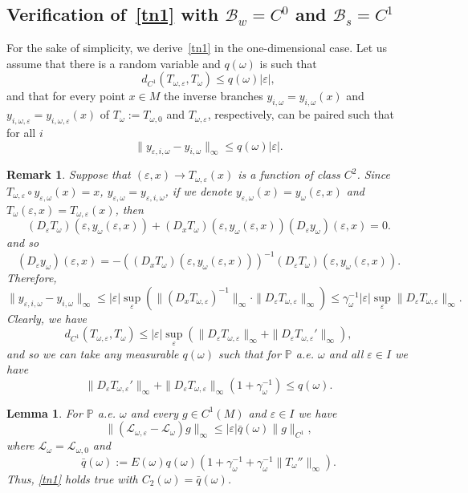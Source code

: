 \documentclass[11pt,reqno,a4paper]{article}
\newtheorem{lemma}[theorem]{Lemma}
\theoremstyle{special}
\newtheorem{remark}[theorem]{Remark}
\renewcommand{\epsilon}{\varepsilon}
\renewcommand{\L}{\mathcal{L}}
\def\B{\mathcal{B}}
\def\om{\omega}
\begin{document}
\subsection{Verification of~\eqref{tn1} with $\B_w=C^0$ and $\B_s=C^1$}
For the sake of simplicity, we derive~\eqref{tn1}  in the one-dimensional case. 
Let us assume that there is a random variable 
and $q(\omega)$ is such that 
\[
d_{C^1}(T_{\omega, \epsilon}, T_\omega) \le q(\omega)|\epsilon|,
\]
and that for every point $x\in M$ the inverse branches $y_{i,\om}=y_{i, \om}(x)$ and $y_{i,\om,\varepsilon}=y_{i,\om,\varepsilon}(x)$ of $T_\om:=T_{\om,0}$ and $T_{\om,\varepsilon}$, respectively, can be paired such that for all $i$
$$
\|y_{\epsilon, i, \omega}-y_{i, \omega}\|_\infty \le q(\omega)| \epsilon|.
$$
\begin{remark}\label{Rem 5.5}
Suppose that $(\varepsilon,x)\to T_{\om, \varepsilon}(x)$ is a function of class $C^2$. Since $T_{\om, \varepsilon}\circ y_{\varepsilon,\om}(x)=x$, $y_{\varepsilon,\om}=y_{\varepsilon,i,\om}$,
if we denote $y_{\varepsilon,\om}(x)=y_\om(\varepsilon,x)$ and $T_\om (\varepsilon, x)=T_{\om, \varepsilon}(x)$,
then
 $$
(D_\varepsilon T_\om)(\varepsilon, y_\om(\varepsilon,x))+(D_x T_\om)(\varepsilon, y_\om(\varepsilon,x))(D_\varepsilon y_\om)(\varepsilon,x)=0.
 $$
and so
 \begin{equation}\label{D y eps}
(D_\varepsilon y_\om)(\varepsilon,x)=-\left((D_x T_\om)(\varepsilon,y_\om(\varepsilon,x))\right)^{-1}(D_\varepsilon T_\om)(\varepsilon,y_\om(\varepsilon,x)).     
 \end{equation}
 Therefore,
$$
\|y_{\epsilon, i, \omega}-y_{i, \omega}\|_\infty\leq |\varepsilon|\sup_{\varepsilon} (\|(D_x T_{\om, \varepsilon})^{-1}\|_\infty \cdot \|D_\varepsilon T_{\om, \varepsilon}\|_\infty)\leq \gamma_\om^{-1}|\varepsilon| \sup_{\varepsilon} \|D_\varepsilon T_{\om, \varepsilon}\|_\infty.
$$
Clearly,  we have 
$$
d_{C^1}(T_{\omega, \epsilon}, T_\omega)\leq |\varepsilon| \sup_{\varepsilon}(\|D_\varepsilon T_{\om, \varepsilon}\|_\infty+\|D_\varepsilon T_{\om, \varepsilon}'\|_\infty),
$$
and so we can take any measurable $q(\om)$ such that for $\mathbb P$ a.e. $\om$ and all $\varepsilon\in I$ we have
$$
\|D_\varepsilon T_{\om, \varepsilon}'\|_\infty+\|D_\varepsilon T_{\om, \varepsilon}\|_\infty(1+ \gamma_\om^{-1})\leq q(\om). 
$$
\end{remark}
\begin{lemma}\label{Lem 5.5}
For $\mathbb P$ a.e. $\om$ and every $g\in C^1(M)$ and $\varepsilon\in I$ we have
\[
\|(\L_{\omega, \epsilon}-\L_\omega)g\|_\infty \le |\epsilon| \bar q(\omega)\|g\|_{C^1},
\]
where $\mathcal L_\om=\mathcal L_{\om,0}$ and
\[
\bar q(\omega):=E(\omega)q(\omega) (1+\gamma_\omega^{-1}+\gamma_\omega^{-1}\|T_\omega''\|_\infty).
\]
Thus, \eqref{tn1} holds true with $C_2(\om)=\bar q(\omega)$.
\end{lemma}
\end{document}

